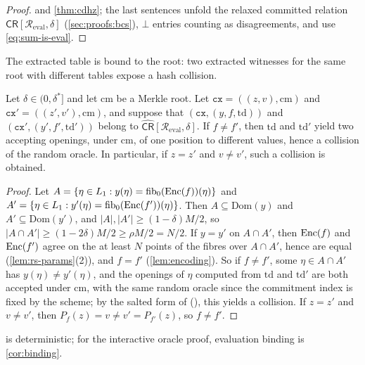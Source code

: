 \begin{proof}
 and \cref{thm:cdhz}; the last sentences unfold the relaxed committed relation $\widehat{\mathsf{CR}}[\mathcal{R}_{\mathrm{eval}},\delta]$ (\cref{sec:proofs:bcs}), $\bot$ entries counting as disagreements, and use \eqref{eq:sum-is-eval}.
\end{proof}

The extracted table is bound to the root: two extracted witnesses for the same root with different tables expose a hash collision.

\begin{lemma}\label{lem:cr-unique}
Let $\delta \in (0,\delta^*]$ and let $\mathrm{cm}$ be a Merkle root. Let $\mathtt{cx} = ((z,v), \mathrm{cm})$ and $\mathtt{cx}' = ((z',v'), \mathrm{cm})$, and suppose that $(\mathtt{cx}, (y, f, \mathrm{td}))$ and $(\mathtt{cx}', (y', f', \mathrm{td}'))$ belong to $\widehat{\mathsf{CR}}[\mathcal{R}_{\mathrm{eval}}, \delta]$.
If $f \ne f'$, then $\mathrm{td}$ and $\mathrm{td}'$ yield two accepting openings, under $\mathrm{cm}$, of one position to different values, hence a collision of the random oracle.
In particular, if $z = z'$ and $v \ne v'$, such a collision is obtained.
\end{lemma}

\begin{proof}
Let $A = \{\eta \in L_1 : y(\eta) = \mathrm{fib}_0(\mathrm{Enc}(f))(\eta)\}$ and $A' = \{\eta \in L_1 : y'(\eta) = \mathrm{fib}_0(\mathrm{Enc}(f'))(\eta)\}$.
Then $A \subseteq \mathrm{Dom}(y)$ and $A' \subseteq \mathrm{Dom}(y')$, and $|A|, |A'| \ge (1-\delta)M/2$, so $|A \cap A'| \ge (1-2\delta)M/2 \ge \rho M/2 = N/2$.
If $y = y'$ on $A \cap A'$, then $\mathrm{Enc}(f)$ and $\mathrm{Enc}(f')$ agree on the at least $N$ points of the fibres over $A \cap A'$, hence are equal (\cref{lem:rs-params}(2)), and $f = f'$ (\cref{lem:encoding}).
So if $f \ne f'$, some $\eta \in A \cap A'$ has $y(\eta) \ne y'(\eta)$, and the openings of $\eta$ computed from $\mathrm{td}$ and $\mathrm{td}'$ are both accepted under $\mathrm{cm}$, with the same random oracle since the commitment index is fixed by the scheme; by the salted form of  (), this yields a collision.
If $z = z'$ and $v \ne v'$, then $P_f(z) = v \ne v' = P_{f'}(z)$, so $f \ne f'$.
\end{proof}

 is deterministic; for the interactive oracle proof, evaluation binding is \cref{cor:binding}.

